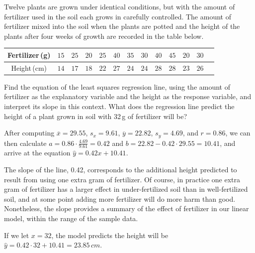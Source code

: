 \begin{example}\label{PlantsRegressionEx}
Twelve plants are grown under identical conditions, but with the amount of fertilizer used in the soil each grows in carefully controlled. The amount of fertilizer mixed into the soil when the plants are potted and the height of the plants after four weeks of growth are recorded in the table below.

\renewcommand{\arraystretch}{1.25}
\begin{center}
\begin{tabular}{|c|c|c|c|c|c|c|c|c|c|c|c|c|}
\hline
Fertilizer\,(g) & $15$ & $25$ & $20$ & $25$ & $40$ & $35$ & $30$ & $40$ & $45$ & $20$ & $30$  \\
\hline
Height\,(cm) & $14$ & $17$ & $18$ & $22$ & $27$ & $24$ & $24$ & $28$ & $28$ & $23$ & $26$   \\
\hline
\end{tabular}
\end{center}

Find the equation of the least squares regression line, using the amount of fertilizer as the explanatory variable and the height as the response variable, and interpret its slope in this context. What does the regression line predict the height of a plant grown in soil with 32\,g of fertilizer will be?

After computing $\overline{x} = 29.55$, $s_x = 9.61$, $\overline{y} = 22.82$, $s_y = 4.69$, and $r = 0.86$, we can then calculate $a = 0.86\cdot\frac{4.69}{9.61} = 0.42$ and $b = 22.82-0.42\cdot29.55 = 10.41$, and arrive at the equation $\widehat{y} = 0.42x+10.41$.

The slope of the line, 0.42, corresponds to the additional height predicted to result from using one extra gram of fertilizer. Of course, in practice one extra gram of fertilizer has a larger effect in under-fertilized soil than in well-fertilized soil, and at some point adding more fertilizer will do more harm than good. Nonetheless, the slope provides a summary of the effect of fertilizer in our linear model, within the range of the sample data.

If we let $x = 32$, the model predicts the height will be $\widehat{y} = 0.42\cdot 32 + 10.41 = 23.85\, cm$.
\end{example}


